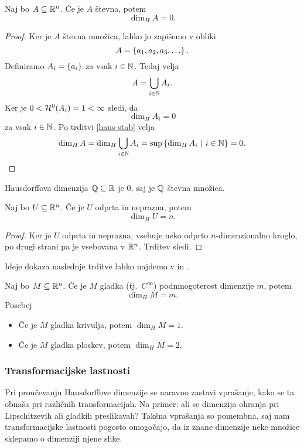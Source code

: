\begin{trditev}
    Naj bo \(A \subseteq \mathbb{R}^n\). Če je \(A\) števna, potem 
    \[\dim_H A = 0.\]
\end{trditev}

\begin{proof}
    Ker je \(A\) števna množica, lahko jo zapišemo v obliki 
    \[A = \left\{a_1, a_2, a_3, \ldots\right\}.\]
    Definiramo \(A_i = \left\{a_i\right\}\) za vsak \(i \in \mathbb{N}\). Tedaj velja
    \[A = \bigcup_{i \in \mathbb{N}} A_i.\]
    Ker je \(0 < \mathcal{H}^0(A_i) = 1 < \infty\) sledi, da 
    \[\dim_H A_i = 0\]
    za vsak \(i \in \mathbb{N}\).
    Po trditvi \ref{haus-stab} velja
    \[\dim_H A = \dim_H \bigcup_{i \in \mathbb{N}} A_i = \sup \left\{\dim_H A_i \ | \ i \in \mathbb{N}\right\} = 0.\]
\end{proof}

\begin{zgled}
    Hausdorffova dimenzija \(\mathbb{Q} \subseteq \mathbb{R}\) je \(0\), saj je \(\mathbb{Q}\) števna množica. 
\end{zgled}

\begin{trditev}
    \label{haus-odp}
    Naj bo \(U \subseteq \mathbb{R}^n\). Če je \(U\) odprta in neprazna, potem 
    \[\dim_H U = n.\]
\end{trditev}

\begin{proof}
    Ker je \(U\) odprta in neprazna, vsebuje neko odprto \(n\)-dimenzionalno kroglo, po drugi strani pa je vsebovana v \(\mathbb{R}^n\). Trditev sledi.
\end{proof}

Ideje dokaza naslednje trditve lahko najdemo v \cite[stran 32]{fk-fg} in \cite[stran 351]{f-ra}.
\begin{trditev}
    Naj bo \(M \subseteq \mathbb{R}^n\). Če je \(M\) gladka (tj.\ \(C^\infty\)) podmnogoterost dimenzije \(m\), potem 
    \[\dim_H M = m.\]
    Posebej 
    \begin{itemize}
        \item Če je \(M\) gladka krivulja, potem \(\dim_H M = 1.\)
        \item Če je \(M\) gladka ploskev, potem \(\dim_H M = 2.\)
    \end{itemize}
\end{trditev}

\subsubsection{Transformacijske lastnosti}
Pri proučevanju Hausdorffove dimenzije se naravno zastavi vprašanje, kako se ta obnaša pri različnih transformacijah. Na primer: ali se dimenzija ohranja pri Lipschitzevih ali gladkih preslikavah? Takšna vprašanja so pomembna, saj nam transformacijske lastnosti pogosto omogočajo, da iz znane dimenzije neke množice sklepamo o dimenziji njene slike.

